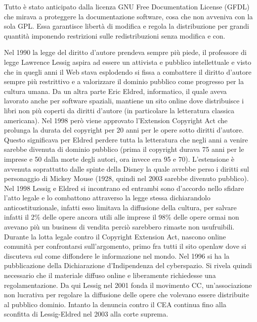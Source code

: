 \documentclass[a4paper]{article}
\begin{document}
			Tutto è stato anticipato dalla licenza GNU Free Documentation License (GFDL) che mirava a proteggere la documentazione software, cosa che non avveniva con la sola GPL. Essa garantisce libertà di modifica e regola la distribuzione per grandi quantità imponendo restrizioni sulle redistribuzioni senza modifica e con.
			
			Nel 1990 la legge del diritto d'autore prendeva sempre più piede, il professore di legge Lawrence Lessig aspira ad essere un attivista e pubblico intellettuale e visto che in quegli anni il Web stava esplodendo si fissa a combattere il diritto d'autore sempre più restrittivo e a valorizzare il dominio pubblico come progresso per la cultura umana. 
			Da un altra parte Eric Eldred, informatico, il quale aveva lavorato anche per software spaziali, mantiene un sito online dove distribuisce i libri non più coperti da diritti d'autore (in particolare la letteratura classica americana). Nel 1998 però viene approvato l'Extension Copyright Act che prolunga la durata del copyright per 20 anni per le opere sotto diritti d'autore. Questo significava per Eldred perdere tutta la letteratura che negli anni a venire sarebbe divenuta di dominio pubblico (prima il copyright durava 75 anni per le imprese e 50 dalla morte degli autori, ora invece era 95 e 70). L'estensione è avvenuta soprattutto dalle spinte della Disney la quale avrebbe perso i diritti sul personaggio di Mickey Mouse (1928, quindi nel 2003 sarebbe divenuto pubblico).
			Nel 1998 Lessig e Eldred si incontrano ed entrambi sono d'accordo nello sfidare l'atto legale e lo combattono attraverso la legge stessa dichiarandolo anticostituzionale, infatti esso limitava la diffusione della cultura, per salvare infatti il 2\% delle opere ancora utili alle imprese il 98\% delle opere ormai non avevano più un business di vendita perciò sarebbero rimaste non usufruibili.
			Durante la lotta legale contro il Copyright Extension Act, nascono online comunità per confrontarsi sull'argomento, primo fra tutti il sito openlaw dove si discuteva sul come diffondere le informazione nel mondo. Nel 1996 si ha la pubblicazione della Dichiarazione d'Indipendenza del cyberspazio. Si rivela quindi necessario che il materiale diffuso online e liberamente richiedesse una regolamentazione. Da qui Lessig nel 2001 fonda il movimento CC, un'associazione non lucrativa per regolare la diffusione delle opere che volevano essere distribuite al pubblico dominio.  Intanto la denuncia contro il CEA continua fino alla sconfitta di Lessig-Eldred nel 2003 alla corte suprema.
		
\end{document}
